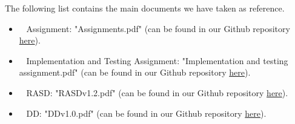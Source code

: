 The following list contains the main documents we have taken as reference.

\begin{itemize}
\item~ Assignment: "Assignments.pdf" (can be found in our Github repository \href{https://github.com/TommasoBianchi/BettiBianchi_SWENG2/blob/master/Assignments.pdf}{here}).
\item~ Implementation and Testing Assignment: "Implementation and testing assignment.pdf" (can be found in our Github repository \href{https://github.com/TommasoBianchi/BettiBianchi_SWENG2/blob/master/Implementation%20and%20testing%20assignment.pdf}{here}).
\item~ RASD: "RASDv1.2.pdf" (can be found in our Github repository \href{https://github.com/TommasoBianchi/BettiBianchi_SWENG2/blob/master/Releases}{here}).
\item~ DD: "DDv1.0.pdf" (can be found in our Github repository \href{https://github.com/TommasoBianchi/BettiBianchi_SWENG2/blob/master/Releases}{here}).
\end{itemize}